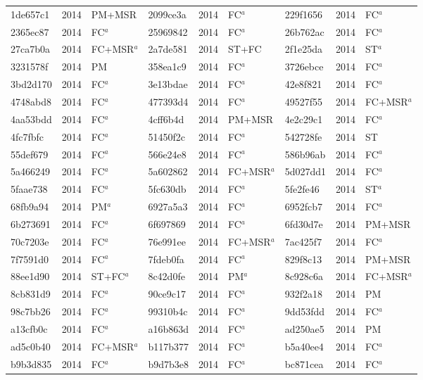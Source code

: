 \begin{longtable}{lll@{\hspace{10pt}}lll@{\hspace{10pt}}lll}
1de657c1 & 2014 & PM+MSR & 2099ce3a & 2014 & FC$^{a}$ & 229f1656 & 2014 & FC$^{a}$ \\
2365ec87 & 2014 & FC$^{a}$ & 25969842 & 2014 & FC$^{a}$ & 26b762ac & 2014 & FC$^{a}$ \\
27ca7b0a & 2014 & FC+MSR$^{a}$ & 2a7de581 & 2014 & ST+FC & 2f1e25da & 2014 & ST$^{a}$ \\
3231578f & 2014 & PM & 358ea1c9 & 2014 & FC$^{a}$ & 3726ebce & 2014 & FC$^{a}$ \\
3bd2d170 & 2014 & FC$^{a}$ & 3e13bdae & 2014 & FC$^{a}$ & 42e8f821 & 2014 & FC$^{a}$ \\
4748abd8 & 2014 & FC$^{a}$ & 477393d4 & 2014 & FC$^{a}$ & 49527f55 & 2014 & FC+MSR$^{a}$ \\
4aa53bdd & 2014 & FC$^{a}$ & 4cff6b4d & 2014 & PM+MSR & 4e2c29c1 & 2014 & FC$^{a}$ \\
4fc7fbfc & 2014 & FC$^{a}$ & 51450f2c & 2014 & FC$^{a}$ & 542728fe & 2014 & ST \\
55def679 & 2014 & FC$^{a}$ & 566e24e8 & 2014 & FC$^{a}$ & 586b96ab & 2014 & FC$^{a}$ \\
5a466249 & 2014 & FC$^{a}$ & 5a602862 & 2014 & FC+MSR$^{a}$ & 5d027dd1 & 2014 & FC$^{a}$ \\
5faae738 & 2014 & FC$^{a}$ & 5fc630db & 2014 & FC$^{a}$ & 5fe2fe46 & 2014 & ST$^{a}$ \\
68fb9a94 & 2014 & PM$^{a}$ & 6927a5a3 & 2014 & FC$^{a}$ & 6952fcb7 & 2014 & FC$^{a}$ \\
6b273691 & 2014 & FC$^{a}$ & 6f697869 & 2014 & FC$^{a}$ & 6fd30d7e & 2014 & PM+MSR \\
70c7203e & 2014 & FC$^{a}$ & 76e991ee & 2014 & FC+MSR$^{a}$ & 7ac425f7 & 2014 & FC$^{a}$ \\
7f7591d0 & 2014 & FC$^{a}$ & 7fdeb0fa & 2014 & FC$^{a}$ & 829f8c13 & 2014 & PM+MSR \\
88ee1d90 & 2014 & ST+FC$^{a}$ & 8c42d0fe & 2014 & PM$^{a}$ & 8c928c6a & 2014 & FC+MSR$^{a}$ \\
8cb831d9 & 2014 & FC$^{a}$ & 90ce9c17 & 2014 & FC$^{a}$ & 932f2a18 & 2014 & PM \\
98c7bb26 & 2014 & FC$^{a}$ & 99310b4c & 2014 & FC$^{a}$ & 9dd53fdd & 2014 & FC$^{a}$ \\
a13cfb0c & 2014 & FC$^{a}$ & a16b863d & 2014 & FC$^{a}$ & ad250ae5 & 2014 & PM \\
ad5c0b40 & 2014 & FC+MSR$^{a}$ & b117b377 & 2014 & FC$^{a}$ & b5a40ee4 & 2014 & FC$^{a}$ \\
b9b3d835 & 2014 & FC$^{a}$ & b9d7b3e8 & 2014 & FC$^{a}$ & bc871cea & 2014 & FC$^{a}$ \\

\end{longtable}
